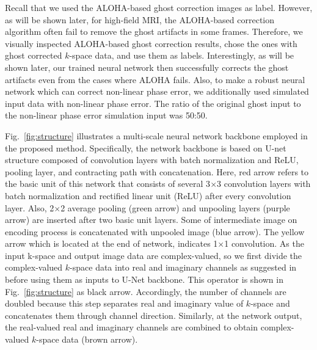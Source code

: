 \documentclass[num-refs]{wiley-article}
\newcommand{\0}{{\boldsymbol{0}}}
\newcommand{\1}{\blmath{1}}
\begin{document}
	Recall that we used the ALOHA-based ghost correction images as label. However, as will be shown later, for high-field MRI, the ALOHA-based correction algorithm often fail to remove the ghost artifacts in some frames. Therefore,  we visually inspected ALOHA-based ghost correction results, chose the ones with ghost corrected $k$-space data, and use them as labels. Interestingly, as will be shown later, our trained neural network then successfully corrects the ghost artifacts even from the cases where ALOHA fails. 
	Also, to make a robust neural network which can correct non-linear phase error, we additionally used  simulated input data with non-linear phase error. The ratio of the original ghost input to the non-linear phase error simulation input was 50:50.
	
	
	Fig.~\ref{fig:structure} illustrates a multi-scale neural network backbone employed in the proposed method. Specifically, the network backbone is based on U-net structure \cite{ronneberger2015u}  composed of convolution layers with batch normalization and ReLU, pooling layer, and contracting path with concatenation. Here, red arrow refers to the basic unit of this network that consists of several 3$\times$3 convolution layers with batch normalization and rectified linear unit (ReLU) after every convolution layer. Also, 2$\times$2 average pooling (green arrow) and unpooling layers (purple arrow) are inserted after two basic unit layers. Some of intermediate image on encoding process is concatenated with unpooled image (blue arrow). The yellow arrow which is located at the end of network, indicates 1$\times$1 convolution. 
	As the input k-space and output image data are complex-valued, so  we  first divide the complex-valued $k$-space data into real and imaginary channels as suggested in \cite{han2018k} before using them as inputs to U-Net backbone. This operator is shown in Fig.~\ref{fig:structure} as black arrow. Accordingly,
	the number of channels are doubled because this  step separates real and imaginary value of $k$-space and concatenates them through channel direction. Similarly, at the network output, the real-valued real and imaginary channels are combined to obtain complex-valued $k$-space data (brown arrow).
	
	
	
\end{document}
